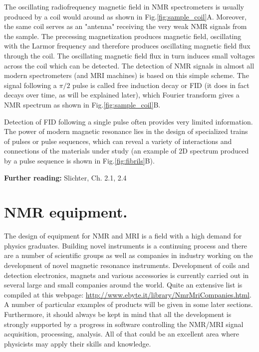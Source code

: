 \documentclass[a4paper, 12pt]{article}
\begin{document}
The oscillating radiofrequency magnetic field in NMR spectrometers is usually produced by a coil would around as shown in Fig.\ref{fig:sample_coil}A. Moreover, the same coil serves as an "antenna" receiving the very weak NMR signals from the sample. The precessing magnetization produces magnetic field, oscillating with the Larmor frequency and therefore produces oscillating  magnetic field flux through the coil. The oscillating magnetic field flux in turn induces small voltages across the coil which can be detected. The detection of NMR signals in almost all modern spectrometers (and MRI machines) is based on this simple scheme. The signal following a $\pi/2$ pulse is called free induction decay or FID (it does in fact decays over time, as will be explained later), which Fourier transform gives a NMR spectrum as shown in Fig.\ref{fig:sample_coil}B.

Detection of FID following a single pulse often provides very limited information. The power of modern magnetic resonance lies in the design of specialized trains of pulses or pulse sequences, which can reveal a variety of interactions and connections of the materials under study (an example of 2D spectrum produced by a pulse sequence is shown in Fig.\ref{fig:fibrils}B).

\textbf{Further reading:} Slichter, Ch. 2.1, 2.4 





\section{NMR equipment.}

The design of equipment for NMR and MRI is a field with a high demand for physics graduates. Building novel instruments is a continuing process and there are a number of scientific groups as well as companies in industry working on the development of novel magnetic resonance instruments.
  Development of coils and detection electronics, magnets and various accessories is currently carried out in several large and small companies around the world. Quite an extensive list is compiled at this webpage: \url{http://www.ebyte.it/library/NmrMriCompanies.html}. A number of particular examples of products will be given in some later sections.
 Furthermore, it should always be kept in mind that all the development is strongly supported by a progress in software controlling the NMR/MRI signal acquisition, processing, analysis. All of that could be an excellent area where physicists may apply their skills and knowledge.
\end{document}
